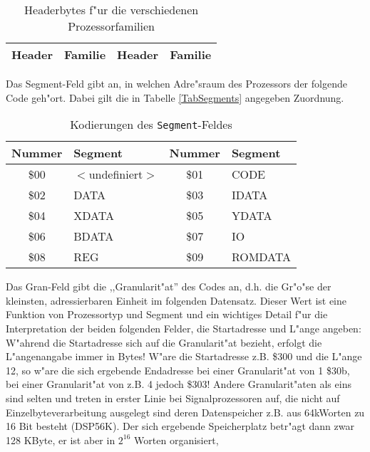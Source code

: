 \documentclass[12pt,a4paper,twoside]{report}
\begin{document}
\begin{table*}[htbp]
\begin{center}\begin{tabular}{|c|l||c|l|}
\hline
Header & Familie & Header & Familie \\
\hline
\hline

\end{tabular}\end{center}
\caption{Headerbytes f"ur die verschiedenen Prozessorfamilien\label{TabHeader2}}
\end{table*}

Das Segment-Feld gibt an, in welchen Adre"sraum des Prozessors der
folgende Code geh"ort.  Dabei gilt die in Tabelle \ref{TabSegments}
angegeben Zuordnung.
\begin{table*}[htbp]
\begin{center}\begin{tabular}{|c|l||c|l|}
\hline
Nummer & Segment & Nummer & Segment \\
\hline
\hline
\$00 &    $<$undefiniert$>$    & \$01 &    CODE \\
\$02 &    DATA                 & \$03 &    IDATA \\
\$04 &    XDATA                & \$05 &    YDATA \\
\$06 &    BDATA                & \$07 &    IO \\
\$08 &    REG                  & \$09 &    ROMDATA \\
\hline
\end{tabular}\end{center}
\caption{Kodierungen des {\tt Segment}-Feldes\label{TabSegments}
         \label{TabSegmentNums}}
\end{table*}
Das Gran-Feld gibt die ,,Granularit"at'' des Codes an, d.h. die Gr"o"se
der kleinsten, adressierbaren Einheit im folgenden Datensatz.  Dieser
Wert ist eine Funktion von Prozessortyp und Segment und ein wichtiges
Detail f"ur die Interpretation der beiden folgenden Felder, die
Startadresse und L"ange angeben: W"ahrend die Startadresse sich auf die
Granularit"at bezieht, erfolgt die L"angenangabe immer in Bytes!  W"are
die Startadresse z.B. \$300 und die L"ange 12, so w"are die sich
ergebende Endadresse bei einer Granularit"at von 1 \$30b, bei einer
Granularit"at von z.B. 4 jedoch \$303!  Andere Granularit"aten als eins
sind selten und treten in erster Linie bei Signalprozessoren auf, die
nicht  auf Einzelbyteverarbeitung ausgelegt sind deren Datenspeicher z.B.
aus 64kWorten zu 16 Bit besteht (DSP56K).  Der sich ergebende Speicherplatz
betr"agt dann zwar 128 KByte, er ist aber in $2^{16}$ Worten organisiert,
\end{document}
